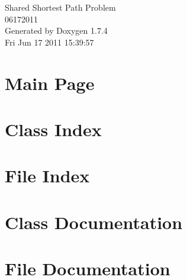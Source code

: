\documentclass[a4paper]{book}
\begin{document}
\hypersetup{pageanchor=false}
\begin{titlepage}
\vspace*{7cm}
\begin{center}
{\Large Shared Shortest Path Problem \\[1ex]\large 06172011 }\\
\vspace*{1cm}
{\large Generated by Doxygen 1.7.4}\\
\vspace*{0.5cm}
{\small Fri Jun 17 2011 15:39:57}\\
\end{center}
\end{titlepage}
\clearemptydoublepage
{}
\tableofcontents
\clearemptydoublepage
{}
\hypersetup{pageanchor=true}
\chapter{Main Page}
\label{index}\hypertarget{index}{}
\chapter{Class Index}

\chapter{File Index}

\chapter{Class Documentation}

















\chapter{File Documentation}



\printindex
\end{document}

